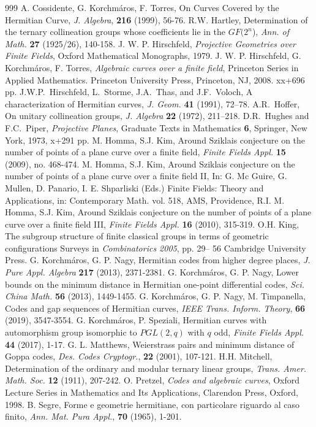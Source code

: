\documentclass[9pt]{article}
\theoremstyle{plain}
\begin{document}
\begin{thebibliography}{999}
 A. Cossidente, G. Korchm\'{a}ros, F. Torres, On Curves Covered by the Hermitian Curve, \emph{J. Algebra}, {\bf{216}} (1999), 56-76.
  R.W. Hartley, Determination of the ternary collineation groups whose coefficients lie in the $GF(2^n$), \emph{Ann. of Math.} {\bf{27}} (1925/26), 140-158.
 J. W. P. Hirschfeld, \textit{Projective Geometries over Finite Fields}, Oxford Mathematical Monographs, 1979.
 J. W. P. Hirschfeld, G. Korchm\'{a}ros, F. Torres, \textit{Algebraic curves over a finite field}, Princeton Series in Applied Mathematics. Princeton University Press, Princeton, NJ, 2008. xx+696 pp. 
  J.W.P.~Hirschfeld, L.~Storme,
J.A.~Thas, and J.F.~Voloch,  A characterization of Hermitian
curves, \emph{J. Geom.} {\bf 41} (1991), 72--78.
   A.R.~Hoffer,  On unitary collineation groups, \emph{J. Algebra} {\bf 22} (1972), 211--218.
  D.R.~Hughes and F.C.~Piper, \emph{Projective Planes}, Graduate Texts in Mathematics {\bf 6}, Springer, New York, 1973, x+291 pp.
  M. Homma, S.J. Kim, Around Sziklais conjecture on the number of points of a plane curve over a finite field, \emph{Finite Fields Appl.} {\bf{15}} (2009), no. 468-474.
  M. Homma, S.J. Kim, Around Sziklais conjecture on the number of points of a plane curve over a finite field II, In: G. Mc Guire, G. Mullen, D. Panario, I. E. Shparliski (Eds.) Finite Fields: Theory and Applications, in: Contemporary Math. vol. 518, AMS, Providence, R.I. 
   M. Homma, S.J. Kim, Around Sziklais conjecture on the number of points of a plane curve over a finite field III, \emph{Finite Fields Appl.} {\bf{16}} (2010), 315-319.
  O.H.  King, The subgroup structure of finite classical groups in
 terms of geometric configurations Surveys in \emph{Combinatorics 2005}, pp. 29-- 56
 Cambridge University Press.
 G. Korchm\'{a}ros, G. P. Nagy, Hermitian codes from higher degree places, \emph{ J. Pure Appl. Algebra } {\bf{217}} (2013),  2371-2381.
 G. Korchm\'{a}ros, G. P. Nagy, Lower bounds on the minimum distance in Hermitian one-point differential codes, \emph{ Sci. China Math. } {\bf{56}} (2013), 1449-1455.
 G. Korchm\'{a}ros, G. P. Nagy, M. Timpanella, Codes and gap sequences of Hermitian curves, \emph{ IEEE Trans. Inform. Theory}, {\bf{66}} (2019), 3547-3554.
 G. Korchm\'{a}ros, P. Speziali, Hermitian curves with automorphism group isomorphic to $PGL(2,q)$ with $q$ odd, \emph{Finite Fields Appl.} {\bf{44}} (2017), 1-17.
 G. L. Matthews, Weierstrass pairs and minimum distance of Goppa codes, \emph{Des. Codes Cryptogr.}, {\bf{22}} (2001), 107-121.
  H.H. Mitchell, Determination of the ordinary and modular ternary linear
 groups, \emph{Trans. Amer. Math. Soc.} {\bf{12}} (1911), 207-242.
 O. Pretzel, \textit{Codes and algebraic curves}, Oxford Lecture Series in Mathematics and Its Applications, Clarendon Press, Oxford, 1998.
 B. Segre, Forme e geometrie hermitiane, con particolare riguardo al caso finito, \emph{Ann. Mat. Pura Appl.}, {\bf{70}} (1965), 1-201.

\end{thebibliography}
\end{document}
